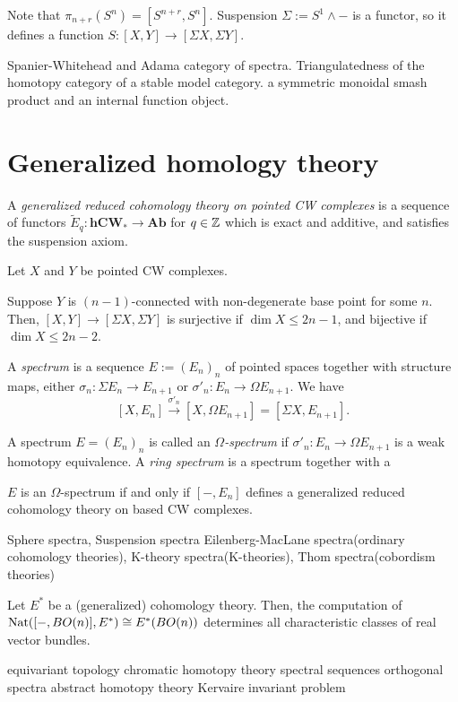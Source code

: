 \documentclass{../../large}
\begin{document}
Note that $\pi_{n+r}(S^n)=[S^{n+r},S^n]$.
Suspension $\Sigma:=S^1\wedge-$ is a functor, so it defines a function $S:[X,Y]\to[\Sigma X,\Sigma Y]$.


Spanier-Whitehead and Adama category of spectra.
Triangulatedness of the homotopy category of a stable model category.
a symmetric monoidal smash product and an internal function object.



\section{Generalized homology theory}

A \emph{generalized reduced cohomology theory on pointed CW complexes} is a sequence of functors $\tilde E_q:\mathbf{hCW}_*\to\mathbf{Ab}$ for $q\in\mathbb{Z}$ which is exact and additive, and satisfies the suspension axiom.

\begin{prb}
Let $X$ and $Y$ be pointed CW complexes.
\begin{parts}
\item Suppose $Y$ is $(n-1)$-connected with non-degenerate base point for some $n$. Then, $[X,Y]\to[\Sigma X,\Sigma Y]$ is surjective if $\dim X\le 2n-1$, and bijective if $\dim X\le2n-2$.
\end{parts}
\end{prb}


\begin{prb}
A \emph{spectrum} is a sequence $E:=(E_n)_n$ of pointed spaces together with structure maps, either $\sigma_n:\Sigma E_n\to E_{n+1}$ or $\sigma'_n:E_n\to\Omega E_{n+1}$.
We have
\[[X,E_n]\xrightarrow{\sigma'_n}[X,\Omega E_{n+1}]=[\Sigma X,E_{n+1}].\]
\end{prb}

\begin{prb}
A spectrum $E=(E_n)_n$ is called an \emph{$\Omega$-spectrum} if $\sigma'_n:E_n\to\Omega E_{n+1}$ is a weak homotopy equivalence.
A \emph{ring spectrum} is a spectrum together with a 
\begin{parts}
\item $E$ is an $\Omega$-spectrum if and only if $[-,E_n]$ defines a generalized reduced cohomology theory on based CW complexes.
\end{parts}
\end{prb}


Sphere spectra, Suspension spectra
Eilenberg-MacLane spectra(ordinary cohomology theories), K-theory spectra(K-theories), Thom spectra(cobordism theories)



Let $E^*$ be a (generalized) cohomology theory.
Then, the computation of $\operatorname{Nat}([-,BO(n)],E^*)\cong E^*(BO(n))$ determines all characteristic classes of real vector bundles.




equivariant topology
chromatic homotopy theory
spectral sequences
orthogonal spectra
abstract homotopy theory
Kervaire invariant problem
\end{document}
